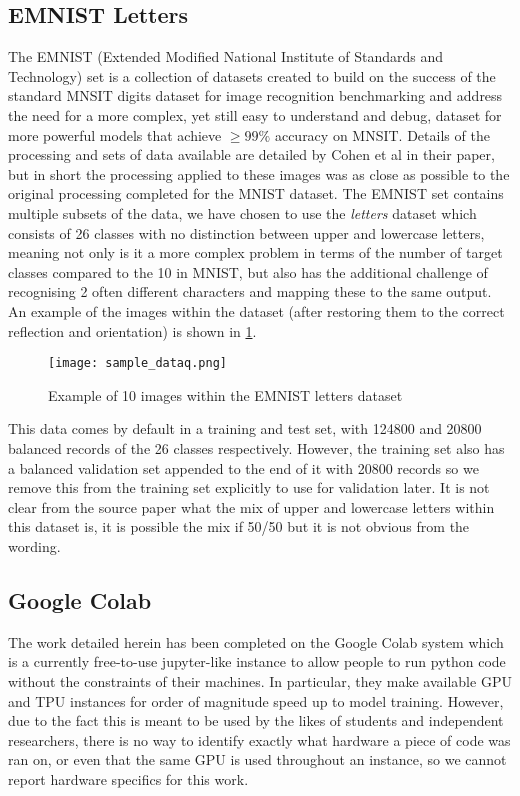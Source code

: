 \documentclass[12pt]{article}
\numberwithin{equation}{section}
\numberwithin{figure}{section}
\numberwithin{table}{section}
\begin{document}
\subsection{EMNIST Letters}
The EMNIST (Extended Modified National Institute of Standards and Technology) set is a collection of datasets created to build on the success of the standard MNSIT digits dataset for image recognition benchmarking and address the need for a more complex, yet still easy to understand and debug, dataset for more powerful models that achieve $\geq 99\%$ accuracy on MNSIT. Details of the processing and sets of data available are detailed by Cohen et al\cite{Cohen} in their paper, but in short the processing applied to these images was as close as possible to the original processing completed for the MNIST dataset. The EMNIST set contains multiple subsets of the data, we have chosen to use the \emph{letters} dataset which consists of 26 classes with no distinction between upper and lowercase letters, meaning not only is it a more complex problem in terms of the number of target classes compared to the 10 in MNIST, but also has the additional challenge of recognising 2 often different characters and mapping these to the same output. An example of the images within the dataset (after restoring them to the correct reflection and orientation) is shown in \cref{fig:samp_data}.

\begin{figure}
	\centering
	\captionsetup{justification=centering}
  \texttt{[image: sample\_dataq.png]}
	\caption{Example of 10 images within the EMNIST letters dataset}
	\label{fig:samp_data}
\end{figure}

This data comes by default in a training and test set, with 124800 and 20800 balanced records of the 26 classes respectively. However, the training set also has a balanced validation set appended to the end of it with 20800 records so we remove this from the training set explicitly to use for validation later. It is not clear from the source paper what the mix of upper and lowercase letters within this dataset is, it is possible the mix if 50/50 but it is not obvious from the wording. 

\subsection{Google Colab}
The work detailed herein has been completed on the Google Colab \cite{Google} system which is a currently free-to-use jupyter-like instance to allow people to run python code without the constraints of their machines. In particular, they make available GPU and TPU instances for order of magnitude speed up to model training. However, due to the fact this is meant to be used by the likes of students and independent researchers, there is no way to identify exactly what hardware a piece of code was ran on, or even that the same GPU is used throughout an instance, so we cannot report hardware specifics for this work.
\end{document}
